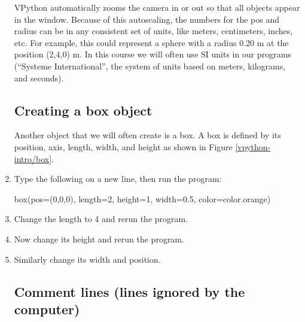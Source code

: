 \begin{enumerate}
VPython automatically zooms the camera in or out so that all objects appear in the window. Because of this autoscaling, the numbers for the pos and radius can be in any consistent set of units, like meters, centimeters, inches, etc. For example, this could represent a sphere with a radius 0.20 m at the position (2,4,0) m. In this course we will often use SI units in our programs (``Systeme International'', the system of units based on meters, kilograms, and seconds).

	\subsection*{Creating a box object}

Another object that we will often create is a box. A box is defined by its position, axis, length, width, and height as shown in Figure \ref{vpython-intro/box}.


	\item Type the following on a new line, then run the program:

\begin{myvpython}
box(pos=(0,0,0), length=2, height=1, width=0.5, color=color.orange)
\end{myvpython}

	\item Change the length to 4 and rerun the program.
	
	\item Now change its height and rerun the program.
	
	\item Similarly change its width and position.


	\subsection*{Comment lines (lines ignored by the computer)}


\end{enumerate}
